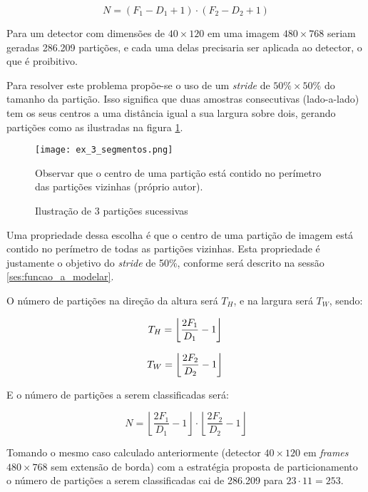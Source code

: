 \begin{equation}
	N = (F_1 - D_1 + 1) \cdot (F_2 - D_2 + 1)
\end{equation}

Para um detector com dimensões  de $40 \times 120$ em uma imagem
$480 \times 768$ seriam geradas 286.209 partições, e cada uma delas precisaria
ser aplicada ao detector, o que é proibitivo.

Para resolver este problema propõe-se o uso de um \emph{stride} de
$50\% \times 50\%$ do tamanho da partição. Isso significa que duas amostras
consecutivas (lado-a-lado) tem os seus centros a uma distância igual a sua
largura sobre dois, gerando partições como as ilustradas na figura
\ref{fig:ex_3_segmentos}.

\begin{figure}[!htb]
	\centering
	\texttt{[image: ex\_3\_segmentos.png]}
	\caption{Ilustração de 3 partições sucessivas}
	\label{fig:ex_3_segmentos}
	Observar que o centro de uma partição está contido no perímetro das
	partições vizinhas (próprio autor).
\end{figure}

Uma propriedade dessa escolha é que o centro de uma partição de imagem está
contido no perímetro de todas as partições vizinhas. Esta propriedade é
justamente o objetivo do \emph{stride} de 50\%, conforme será descrito na
sessão \ref{ses:funcao_a_modelar}.

O número de partições na direção da altura será $T_H$, e na largura será
$T_W$, sendo:

\begin{equation}
	T_H=\left\lfloor \frac{2F_1}{D_1}-1 \right\rfloor \\
\end{equation}

\begin{equation}
	T_W=\left\lfloor \frac{2F_2}{D_2}-1 \right\rfloor \\
\end{equation}

E o número de partições a serem classificadas será:

\begin{equation}
	N=\left\lfloor \frac{2F_1}{D_1}-1 \right\rfloor \cdot
		\left\lfloor \frac{2F_2}{D_2}-1 \right\rfloor
\end{equation}

Tomando o mesmo caso calculado anteriormente (detector $40 \times 120$ em
\emph{frames} $480 \times 768$ sem extensão de borda) com a estratégia proposta
de particionamento o número de partições a serem classificadas cai de 286.209
para $23 \cdot 11=253$.

